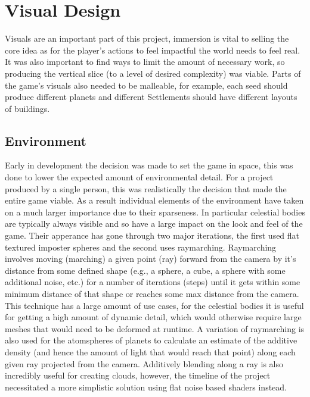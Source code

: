 \documentclass{report}
\begin{document}
\section{Visual Design}

Visuals are an important part of this project, immersion is vital to selling the core idea as for the player's actions to feel impactful the world needs to feel real. It was also important to find ways to limit the amount of necessary work, so producing the vertical slice (to a level of desired complexity) was viable. Parts of the game's visuals also needed to be malleable, for example, each seed should produce different planets and different Settlements should have different layouts of buildings.

\subsection{Environment}

Early in development the decision was made to set the game in space, this was done to lower the expected amount of environmental detail. For a project produced by a single person, this was realistically the decision that made the entire game viable. As a result individual elements of the environment have taken on a much larger importance due to their sparseness. In particular celestial bodies are typically always visible and so have a large impact on the look and feel of the game. Their apperance has gone through two major iterations, the first used flat textured imposter spheres and the second uses raymarching. Raymarching involves moving (marching) a given point (ray) forward from the camera by it's distance from some defined shape (e.g., a sphere, a cube, a sphere with some additional noise, etc.) for a number of iterations (steps) until it gets within some minimum distance of that shape or reaches some max distance from the camera. This technique has a large amount of use cases, for the celestial bodies it is useful for getting a high amount of dynamic detail, which would otherwise require large meshes that would need to be deformed at runtime. A variation of raymarching is also used for the atomspheres of planets to calculate an estimate of the additive density (and hence the amount of light that would reach that point) along each given ray projected from the camera. Additively blending along a ray is also incredibly useful for creating clouds, however, the timeline of the project necessitated a more simplistic solution using flat noise based shaders instead.
\end{document}
